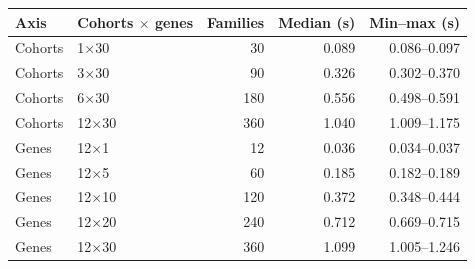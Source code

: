 \begin{tabular}{llrrr}
\toprule
Axis & Cohorts $\times$ genes & Families & Median (s) & Min--max (s)\\
\midrule
Cohorts & 1$\times$30 & 30 & 0.089 & 0.086--0.097\\
Cohorts & 3$\times$30 & 90 & 0.326 & 0.302--0.370\\
Cohorts & 6$\times$30 & 180 & 0.556 & 0.498--0.591\\
Cohorts & 12$\times$30 & 360 & 1.040 & 1.009--1.175\\
Genes & 12$\times$1 & 12 & 0.036 & 0.034--0.037\\
Genes & 12$\times$5 & 60 & 0.185 & 0.182--0.189\\
Genes & 12$\times$10 & 120 & 0.372 & 0.348--0.444\\
Genes & 12$\times$20 & 240 & 0.712 & 0.669--0.715\\
Genes & 12$\times$30 & 360 & 1.099 & 1.005--1.246\\
\bottomrule
\end{tabular}
